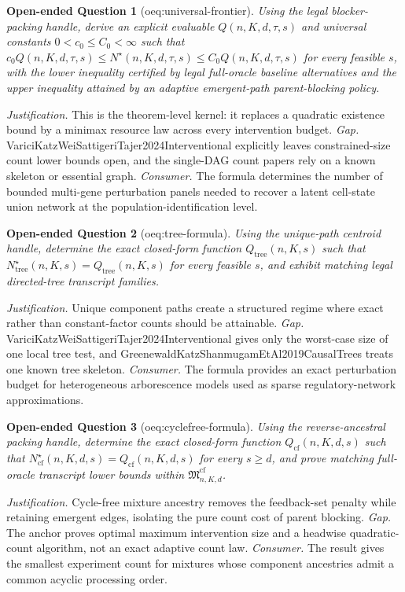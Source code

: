 \documentclass{article}
\newtheorem{openendedquestion}{Open-ended Question}
\begin{document}
\begin{openendedquestion}[oeq:universal-frontier]\label{oeq:universal-frontier}
Using the legal blocker-packing handle, derive an explicit evaluable \(Q(n,K,d,\tau,s)\) and universal constants \(0<c_0\le C_0<\infty\) such that \(c_0Q(n,K,d,\tau,s)\le N^{\star}(n,K,d,\tau,s)\le C_0Q(n,K,d,\tau,s)\) for every feasible \(s\), with the lower inequality certified by legal full-oracle baseline alternatives and the upper inequality attained by an adaptive emergent-path parent-blocking policy.
\end{openendedquestion}
\par\smallskip\noindent \textit{Justification.} This is the theorem-level kernel: it replaces a quadratic existence bound by a minimax resource law across every intervention budget. \textit{Gap.} VariciKatzWeiSattigeriTajer2024Interventional explicitly leaves constrained-size count lower bounds open, and the single-DAG count papers rely on a known skeleton or essential graph. \textit{Consumer.} The formula determines the number of bounded multi-gene perturbation panels needed to recover a latent cell-state union network at the population-identification level.

\begin{openendedquestion}[oeq:tree-formula]\label{oeq:tree-formula}
Using the unique-path centroid handle, determine the exact closed-form function \(Q_{\mathrm{tree}}(n,K,s)\) such that \(N^{\star}_{\mathrm{tree}}(n,K,s)=Q_{\mathrm{tree}}(n,K,s)\) for every feasible \(s\), and exhibit matching legal directed-tree transcript families.
\end{openendedquestion}
\par\smallskip\noindent \textit{Justification.} Unique component paths create a structured regime where exact rather than constant-factor counts should be attainable. \textit{Gap.} VariciKatzWeiSattigeriTajer2024Interventional gives only the worst-case size of one local tree test, and GreenewaldKatzShanmugamEtAl2019CausalTrees treats one known tree skeleton. \textit{Consumer.} The formula provides an exact perturbation budget for heterogeneous arborescence models used as sparse regulatory-network approximations.

\begin{openendedquestion}[oeq:cyclefree-formula]\label{oeq:cyclefree-formula}
Using the reverse-ancestral packing handle, determine the exact closed-form function \(Q_{\mathrm{cf}}(n,K,d,s)\) such that \(N^{\star}_{\mathrm{cf}}(n,K,d,s)=Q_{\mathrm{cf}}(n,K,d,s)\) for every \(s\ge d\), and prove matching full-oracle transcript lower bounds within \(\mathfrak M^{\mathrm{cf}}_{n,K,d}\).
\end{openendedquestion}
\par\smallskip\noindent \textit{Justification.} Cycle-free mixture ancestry removes the feedback-set penalty while retaining emergent edges, isolating the pure count cost of parent blocking. \textit{Gap.} The anchor proves optimal maximum intervention size and a headwise quadratic-count algorithm, not an exact adaptive count law. \textit{Consumer.} The result gives the smallest experiment count for mixtures whose component ancestries admit a common acyclic processing order.
\end{document}

